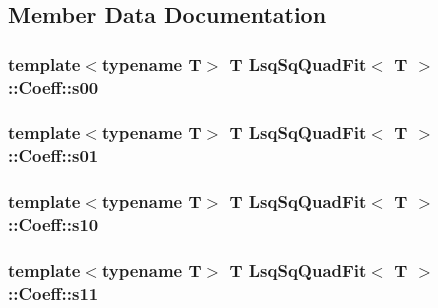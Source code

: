 \subsection{Member Data Documentation}
\subsubsection[{\texorpdfstring{s00}{s00}}]{\setlength{\rightskip}{0pt plus 5cm}template$<$typename T$>$ T {\bf Lsq\+Sq\+Quad\+Fit}$<$ T $>$\+::Coeff\+::s00}\hypertarget{struct_lsq_sq_quad_fit_1_1_coeff_a7197a54e45e95e5e09092555f147cbbe}{}\label{struct_lsq_sq_quad_fit_1_1_coeff_a7197a54e45e95e5e09092555f147cbbe}
\subsubsection[{\texorpdfstring{s01}{s01}}]{\setlength{\rightskip}{0pt plus 5cm}template$<$typename T$>$ T {\bf Lsq\+Sq\+Quad\+Fit}$<$ T $>$\+::Coeff\+::s01}\hypertarget{struct_lsq_sq_quad_fit_1_1_coeff_af9640f1f631cb95b9f5c689f2c92ed82}{}\label{struct_lsq_sq_quad_fit_1_1_coeff_af9640f1f631cb95b9f5c689f2c92ed82}
\subsubsection[{\texorpdfstring{s10}{s10}}]{\setlength{\rightskip}{0pt plus 5cm}template$<$typename T$>$ T {\bf Lsq\+Sq\+Quad\+Fit}$<$ T $>$\+::Coeff\+::s10}\hypertarget{struct_lsq_sq_quad_fit_1_1_coeff_a450e15b091158e154e6f7f935fbad006}{}\label{struct_lsq_sq_quad_fit_1_1_coeff_a450e15b091158e154e6f7f935fbad006}
\subsubsection[{\texorpdfstring{s11}{s11}}]{\setlength{\rightskip}{0pt plus 5cm}template$<$typename T$>$ T {\bf Lsq\+Sq\+Quad\+Fit}$<$ T $>$\+::Coeff\+::s11}\hypertarget{struct_lsq_sq_quad_fit_1_1_coeff_a50a6f1c130d5358398fb7cd01097fe03}{}\label{struct_lsq_sq_quad_fit_1_1_coeff_a50a6f1c130d5358398fb7cd01097fe03}
